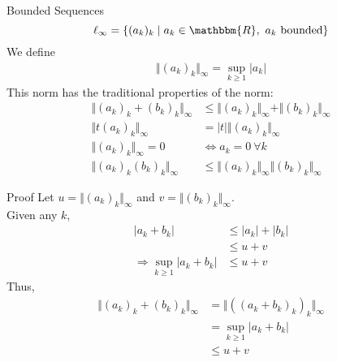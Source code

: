\documentclass[10pt]{extarticle}
\newcommand{\R}{\mathbbm{R}}
\begin{document}
  \begin{problem}{Bounded Sequences}
    \[
      \ell_{\infty} = \left\{(a_k)_k \mid a_k\in\R,~a_k~\text{bounded}\right\}
    \] 
    We define
    \begin{align*}
      \Vert(a_k)_k\Vert_{\infty} = \sup_{k\geq 1}|a_k|\tag*{Infinity Norm}
    \end{align*}
    This norm has the traditional properties of the norm:
    \begin{align*}
      \Vert (a_k)_k + (b_k)_k\Vert_{\infty} &\leq \Vert(a_k)_k\Vert_{\infty} + \Vert(b_k)_k\Vert_{\infty}\tag*{Triangle Inequality}\\
      \Vert t(a_k)_k\Vert_{\infty} &= |t|\Vert(a_k)_k\Vert_{\infty}\tag*{Scalar Multiplication}\\
      \Vert(a_k)_k\Vert_{\infty} = 0 &\Leftrightarrow a_k = 0~\forall k\tag*{Zero Property}\\
      \Vert(a_k)_k(b_k)_k\Vert_{\infty} &\leq \Vert(a_k)_k\Vert_{\infty}\Vert(b_k)_k\Vert_{\infty}\tag*{Multiplication}
    \end{align*}
    \begin{problem}{Proof}
      Let $u = \Vert(a_k)_k\Vert_{\infty}$ and $v = \Vert(b_k)_k\Vert_{\infty}$.\\

      Given any $k$,
      \begin{align*}
        |a_k + b_k| &\leq |a_k| + |b_k| \tag*{Triangle Inequality on $|\cdot|$}\\
                    &\leq u+v \tag*{definition of supremum}\\
        \Rightarrow \sup_{k\geq 1}|a_k + b_k|&\leq u+v
      \end{align*}
      Thus,
      \begin{align*}
        \Vert (a_k)_k + (b_k)_k\Vert_{\infty} &= \Vert \left((a_k + b_k)_k\right)_k\Vert_{\infty}\\
                                              &= \sup_{k\geq 1}|a_k + b_k|\\
                                              &\leq u+v
      \end{align*}
    \end{problem}
  \end{problem}
\end{document}

